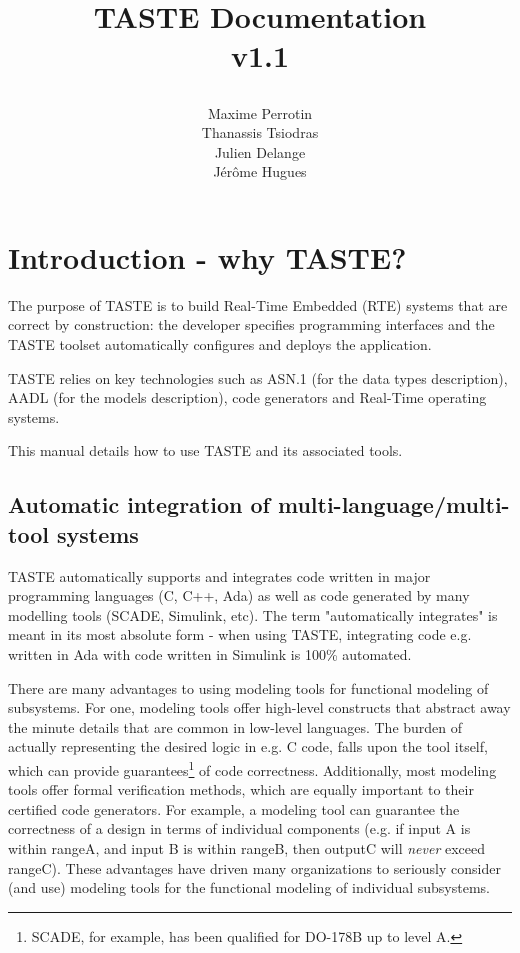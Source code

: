 \documentclass[11pt]{book}
\title{
\centerline{\epsfig{file=imgs/logo-taste.pdf,width=.75\textwidth}}
TASTE Documentation \\ v1.1}
\author{Maxime Perrotin \\ Thanassis Tsiodras \\ Julien
 Delange\\J\'er\^ome Hugues}
\newcommand{\Concept}[1]{#1\xspace}
\newcommand{\taste}{\Concept{TASTE}}
\begin{document}
\maketitle

\newpage

\tableofcontents

\newpage

\chapter{Introduction - why TASTE?}
The purpose of \taste is to build Real-Time Embedded (RTE) systems that are
correct by construction: the developer specifies programming interfaces and
the \taste toolset automatically configures and deploys the application. 

\taste relies on key technologies such as ASN.1 (for the data types description), AADL (for the models description), 
code generators and Real-Time operating systems. 

This manual details how to use \taste and its associated tools.


\section{Automatic integration of multi-language/multi-tool systems}
TASTE automatically supports and integrates code written in major programming languages
(C, C++, Ada) as well as code generated by many modelling tools (SCADE, Simulink, etc).
The term "automatically integrates" is meant in its most absolute form - when using
TASTE, integrating code e.g. written in Ada with code written in Simulink is 100\% automated.

There are many advantages to using modeling tools for functional modeling of subsystems.
For one, modeling tools offer high-level constructs that abstract away the minute details
that are common in low-level languages. The burden of actually representing the desired logic
in e.g. C code, falls upon the tool itself, which can provide guarantees\footnote{SCADE, for
example, has been qualified for DO-178B up to level A.} of code correctness. Additionally,
most modeling tools offer formal verification methods, which are equally important to their 
certified code generators. For example, a modeling tool can guarantee the correctness of a design 
in terms of individual components (e.g. if input A is within rangeA, and input B is within rangeB, 
then outputC will {\em never} exceed rangeC). These advantages have driven many organizations to
seriously consider (and use) modeling tools for the functional modeling of individual subsystems.
\end{document}
